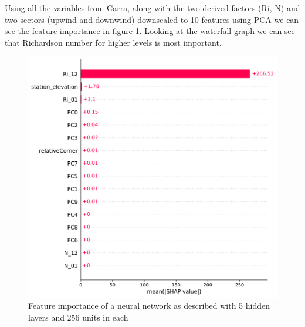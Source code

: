 Using all the variables from Carra, along with the two derived factors (Ri, N) and two sectors (upwind and downwind) downscaled to 10 features using PCA we can see the feature importance in figure \ref{fig:ShapleyWaterfallFirstTry}. Looking at the waterfall graph we can see that Richardson number for higher levels is most important.

\begin{figure}[h]
    \centering
    \includegraphics[scale = 0.6]{Figures/shap_bar_nn_256_example100.png}
    \caption{Feature importance of a neural network as described with 5 hidden layers and 256 units in each}
    \label{fig:ShapleyWaterfallFirstTry}
\end{figure}